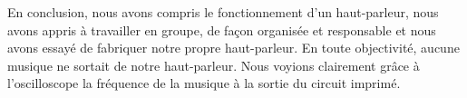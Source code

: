 

En conclusion, nous avons compris le fonctionnement d’un haut-parleur,  nous avons appris à travailler en groupe, de façon organisée et responsable et nous avons essayé de fabriquer notre propre haut-parleur.  En toute objectivité, aucune musique ne sortait de notre haut-parleur.  Nous voyions clairement grâce à l’oscilloscope la fréquence de la musique à la sortie du circuit imprimé.     


